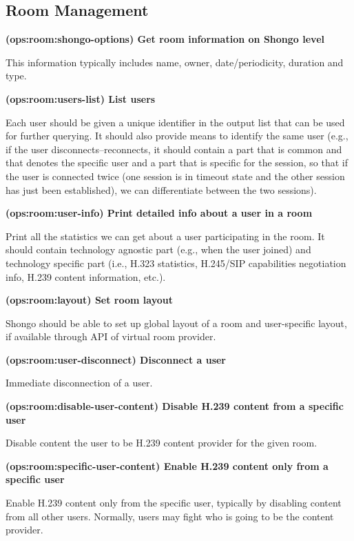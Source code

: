 \documentclass[a4paper]{report}
\makeatletter
\newcounter{UCcounter}
\newenvironment{UseCases}%
	{\begin{list}{\textbf{UC-\arabic{UCcounter}}}{\@nmbrlisttrue\def\@listctr{UCcounter}}}%
	{\end{list}}
\newcommand{\UClabel}[1]{\label{UC:#1}}
\newcommand{\UseCase}[2]{\item\UClabel{#2} \textbf{(#2) #1}\\ \nopagebreak}
\makeatother
\begin{document}
\subsection{Room Management}

\begin{UseCases}

\UseCase{Get room information on Shongo level}{ops:room:shongo-options}

This information typically includes name, owner, date/periodicity, duration and type.


\UseCase{List users}{ops:room:users-list}

Each user should be given a unique identifier in the output list that can be
used for further querying. It should also provide means to identify the same
user (e.g., if the user disconnects--reconnects, it should contain a part that
is common and that denotes the specific user and a part that is specific for
the session, so that if the user is connected twice (one session is in timeout
state and the other session has just been established), we can differentiate
between the two sessions).

\UseCase{Print detailed info about a user in a room}{ops:room:user-info}

Print all the statistics we can get about a user participating in the room. It
should contain technology agnostic part (e.g., when the user joined) and
technology specific part (i.e., H.323 statistics, H.245/SIP capabilities
negotiation info, H.239 content information, etc.).

\UseCase{Set room layout}{ops:room:layout}

Shongo should be able to set up global layout of a room and user-specific
layout, if available through API of virtual room provider.

\UseCase{Disconnect a user}{ops:room:user-disconnect}

Immediate disconnection of a user.

\UseCase{Disable H.239 content from a specific user}{ops:room:disable-user-content}

Disable content the user to be H.239 content provider for the given room.

\UseCase{Enable H.239 content only from a specific user}{ops:room:specific-user-content}

Enable H.239 content only from the specific user, typically by disabling
content from all other users. Normally, users may fight who is going to be the
content provider.


\end{UseCases}
\end{document}
